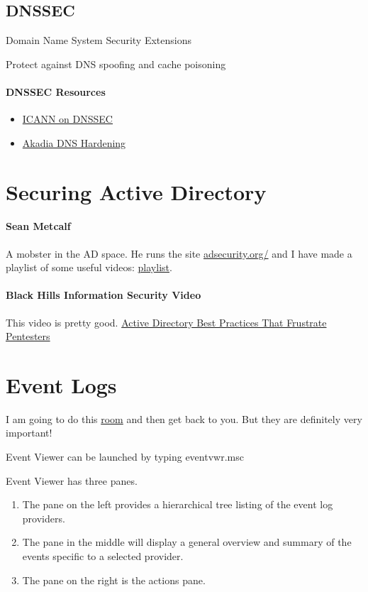\documentclass{article}
\begin{document}
\subsection{DNSSEC}
Domain Name System Security Extensions

Protect against DNS spoofing and cache poisoning

\paragraph{DNSSEC Resources}
\begin{itemize}
\item \href{https://www.icann.org/resources/pages/dnssec-what-is-it-why-important-2019-03-05-en}{ICANN on DNSSEC}
\item \href{https://www.akadia.com/services/dns_hardening.html}{Akadia DNS Hardening}
\end{itemize}

\section{Securing Active Directory}

\paragraph{Sean Metcalf}
A mobster in the AD space. He runs the site \href{https://adsecurity.org/}{adsecurity.org/}
and I have made a playlist of some useful videos: \href{https://www.youtube.com/playlist?list=PLHkV-wwoQ7s_7vUau-eqiscWoZZNC3EcZ}{playlist}.

\paragraph{Black Hills Information Security Video}
This video is pretty good. \href{https://youtu.be/SdNPUhzYTUc?si=FNYSbLUqm-2Kurxp}{Active Directory Best Practices That Frustrate Pentesters}

\section{Event Logs}
I am going to do this \href{https://tryhackme.com/room/windowseventlogs}{room} and then get back to you.
But they are definitely very important!

Event Viewer can be launched by typing eventvwr.msc

Event Viewer has three panes.
\begin{enumerate}
\item The pane on the left provides a hierarchical tree listing of the event log providers.
\item The pane in the middle will display a general overview and summary of the events specific to a selected provider.
\item The pane on the right is the actions pane.
\end{enumerate}
\end{document}
